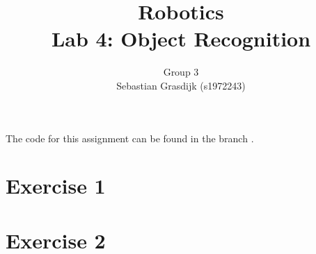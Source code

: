 \documentclass[a4paper]{article}
\title{Robotics\\ Lab 4: Object Recognition}
\author{Group 3\\Sebastian Grasdijk (s1972243)}
\begin{document}
\maketitle

\noindent The code for this assignment can be found in the branch .

\section*{Exercise 1}


\section*{Exercise 2}


\printbibliography

\clearpage
\appendix

\end{document}

